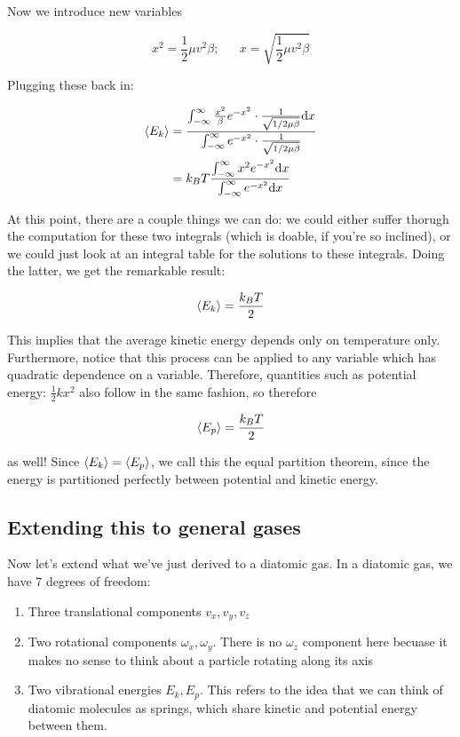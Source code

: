 Now we introduce new variables

\[ x^2 = \frac 12 \mu v^2 \beta; \phantom{aaa} x = \sqrt{ \frac 12 \mu v^2 \beta}\] 

Plugging these back in:

\begin{align*}
    \langle E_k \rangle &= \frac{\int_{-\infty}^{\infty} \frac{x^2}{\beta}e^{-x^2} \cdot \frac{1}{\sqrt{1/2 \mu \beta}} \dd x}{\int_{-\infty}^{\infty} e^{-x^2} \cdot \frac{1}{\sqrt{1/2 \mu \beta}}}\\
    &= k_BT \frac{\int_{-\infty}^{\infty} x^2 e^{-x^2} \dd x}{\int_{-\infty}^{\infty} e^{-x^2} \dd x}
\end{align*}

At this point, there are a couple things we can do: we could either suffer thorugh the computation for these two integrals (which is doable, if you're so inclined), or we could just look at an integral table for the solutions to these integrals. Doing the latter, we get the remarkable result: 

\[ \langle E_k \rangle = \frac{k_BT}{2}\] 

This implies that the average kinetic energy depends only on temperature only. Furthermore, notice that this process can be applied to any variable which has quadratic dependence on a variable. Therefore, quantities such as potential energy: $\frac 12 kx^2$ also follow in the same fashion, so therefore

\[ \langle E_p \rangle = \frac{k_BT}{2}\] 

as well! Since $\langle E_k \rangle = \langle E_p \rangle$, we call this the equal partition theorem, since the energy is partitioned perfectly between potential and kinetic energy.

\subsection{Extending this to general gases} 

Now let's extend what we've just derived to a diatomic gas. In a diatomic gas, we have 7 degrees of freedom: 

\begin{enumerate}
    \item Three translational components $v_x, v_y, v_z$
    \item Two rotational components $\omega_x, \omega_y$. There is no $\omega_z$ component here becuase it makes no sense to think about a particle rotating along its axis
    \item Two vibrational energies $E_k, E_p$. This refers to the idea that we can think of diatomic molecules as springs, which share kinetic and potential energy between them. 
\end{enumerate}

